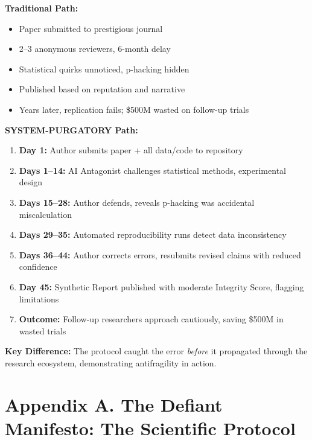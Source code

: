 \documentclass[11pt,a4paper]{article}
\begin{document}
\begin{small}
\textbf{Traditional Path:}
\begin{itemize}[nosep]
    \item Paper submitted to prestigious journal
    \item 2--3 anonymous reviewers, 6-month delay
    \item Statistical quirks unnoticed, p-hacking hidden
    \item Published based on reputation and narrative
    \item Years later, replication fails; \$500M wasted on follow-up trials
\end{itemize}

\textbf{SYSTEM-PURGATORY Path:}
\begin{enumerate}[nosep]
    \item \textbf{Day 1:} Author submits paper + all data/code to repository
    \item \textbf{Days 1--14:} AI Antagonist challenges statistical methods, experimental design
    \item \textbf{Days 15--28:} Author defends, reveals p-hacking was accidental miscalculation
    \item \textbf{Days 29--35:} Automated reproducibility runs detect data inconsistency
    \item \textbf{Days 36--44:} Author corrects errors, resubmits revised claims with reduced confidence
    \item \textbf{Day 45:} Synthetic Report published with moderate Integrity Score, flagging limitations
    \item \textbf{Outcome:} Follow-up researchers approach cautiously, saving \$500M in wasted trials
\end{enumerate}

\textbf{Key Difference:} The protocol caught the error \textit{before} it propagated through the research ecosystem, demonstrating antifragility in action.


\clearpage %



\section*{Appendix A. The Defiant Manifesto: The Scientific Protocol}
\label{app:manifesto}


\end{small}
\end{document}
